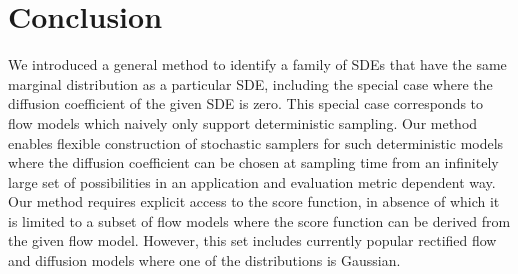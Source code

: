 \section{Conclusion}
\label{sec:conclusion}

We introduced a general method to identify a family of SDEs that have the same marginal distribution as a particular SDE, including the special case where the diffusion coefficient of the given SDE is zero.
This special case corresponds to flow models which naively only support deterministic sampling.
Our method enables flexible construction of stochastic samplers for such deterministic models where the diffusion coefficient can be chosen at sampling time from an infinitely large set of possibilities in an application and evaluation metric dependent way.
Our method requires explicit access to the score function, in absence of which it is limited to a subset of flow models where the score function can be derived from the given flow model.
However, this set includes currently popular rectified flow and diffusion models where one of the distributions is Gaussian.
